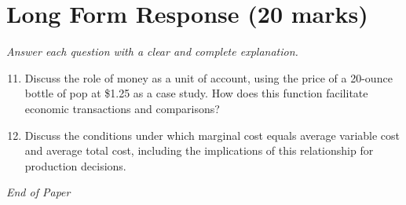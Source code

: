 \documentclass[12pt]{article}
\begin{document}
\section*{Long Form Response (20 marks)}
\textit{Answer each question with a clear and complete explanation.}
\begin{enumerate}[label=\arabic*.]
\setcounter{enumi}{10}
\item Discuss the role of money as a unit of account, using the price of a 20-ounce bottle of pop at \$1.25 as a case study. How does this function facilitate economic transactions and comparisons?
\item Discuss the conditions under which marginal cost equals average variable cost and average total cost, including the implications of this relationship for production decisions.
\end{enumerate}

\vfill
\noindent\textit{End of Paper}
\end{document}
